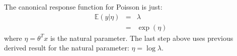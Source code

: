 \begin{answer}

The canonical response function for Poisson is just:
\begin{eqnarray*}
\mathbb{E}(y|\eta) 
    &=& \lambda \\
    &=& \exp(\eta)
\end{eqnarray*}
where $\eta = \theta^T x$ is the natural parameter. The last step above uses 
previous derived result for the natural parameter: $\eta = \log \lambda$.

\end{answer}
